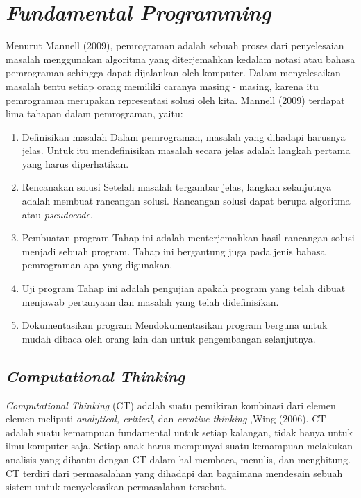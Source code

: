 \section{\textit{Fundamental Programming}}
	Menurut Mannell (2009), pemrograman adalah sebuah proses dari penyelesaian masalah menggunakan algoritma yang diterjemahkan kedalam notasi atau bahasa pemrograman sehingga dapat dijalankan oleh komputer. Dalam menyelesaikan masalah tentu setiap orang memiliki caranya masing - masing, karena itu pemrograman merupakan representasi solusi oleh kita.
	\linebreak\linebreak
	Mannell (2009) terdapat lima tahapan dalam pemrograman, yaitu:
	\begin{enumerate}
		\item Definisikan masalah
			\subitem Dalam pemrograman, masalah yang dihadapi harusnya jelas. Untuk itu mendefinisikan masalah secara jelas adalah langkah pertama yang harus diperhatikan.
		\item Rencanakan solusi
			\subitem Setelah masalah tergambar jelas, langkah selanjutnya adalah membuat rancangan solusi. Rancangan solusi dapat berupa algoritma atau \textit{pseudocode}.
		\item Pembuatan program
			\subitem Tahap ini adalah menterjemahkan hasil rancangan solusi menjadi sebuah program. Tahap ini bergantung juga pada jenis bahasa pemrograman apa yang digunakan.
		\item Uji program
			\subitem Tahap ini adalah pengujian apakah program yang telah dibuat menjawab pertanyaan dan masalah yang telah didefinisikan.
		\item Dokumentasikan program
			\subitem Mendokumentasikan program berguna untuk mudah dibaca oleh orang lain dan untuk pengembangan selanjutnya.
	\end{enumerate}
	\subsection{\textit{Computational Thinking}}
	\textit{Computational Thinking} (CT) adalah suatu pemikiran kombinasi dari elemen elemen meliputi \textit{analytical, critical}, dan \textit{creative thinking} ,Wing (2006).  CT adalah suatu kemampuan fundamental untuk setiap kalangan, tidak hanya untuk ilmu komputer saja. Setiap anak harus mempunyai suatu kemampuan melakukan analisis yang dibantu dengan CT dalam hal membaca, menulis, dan menghitung. CT terdiri dari permasalahan yang dihadapi dan bagaimana mendesain sebuah sistem untuk menyelesaikan permasalahan tersebut.
	
